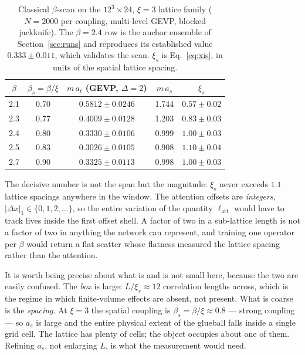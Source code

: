 \documentclass[11pt,a4paper]{article}
\newcommand{\at}{a_t}
\newcommand{\as}{a_s}
\begin{document}
\begin{table}[htbp]
  \centering
  \begin{tabular}{ccccc}
    \toprule
    $\beta$ & $\beta_s=\beta/\xi$ & $m\,\at$ (GEVP, $\Delta=2$) & $m\,\as$
            & $\xi_s$ \\
    \midrule
    2.1 & 0.70 & $0.5812\pm0.0246$ & 1.744 & $0.57\pm0.02$ \\
    2.3 & 0.77 & $0.4009\pm0.0128$ & 1.203 & $0.83\pm0.03$ \\
    2.4 & 0.80 & $0.3330\pm0.0106$ & 0.999 & $1.00\pm0.03$ \\
    2.5 & 0.83 & $0.3026\pm0.0105$ & 0.908 & $1.10\pm0.04$ \\
    2.7 & 0.90 & $0.3325\pm0.0113$ & 0.998 & $1.00\pm0.03$ \\
    \bottomrule
  \end{tabular}
  \caption{Classical $\beta$-scan on the $12^3\times24$, $\xi=3$ lattice
  family ($N=2000$ per coupling, multi-level GEVP, blocked jackknife). The
  $\beta=2.4$ row is the anchor ensemble of Section~\ref{sec:runs} and
  reproduces its established value $0.333\pm0.011$, which validates the scan.
  $\xi_s$ is Eq.~\eqref{eq:xis}, in units of the spatial lattice spacing.}
  \label{tab:betascan}
\end{table}

\noindent The decisive number is not the span but the magnitude: $\xi_s$ never
exceeds $1.1$ lattice spacings anywhere in the window. The attention offsets
are \emph{integers}, $|\Delta x|_1\in\{0,1,2,\dots\}$, so the entire variation
of the quantity $\ell_{\mathrm{att}}$ would have to track lives inside the
first offset shell. A factor of two in a sub-lattice length is not a factor of
two in anything the network can represent, and training one operator per
$\beta$ would return a flat scatter whose flatness measured the lattice
spacing rather than the attention.

It is worth being precise about what is and is not small here, because the two
are easily confused. The \emph{box} is large: $L/\xi_s \approx 12$ correlation
lengths across, which is the regime in which finite-volume effects are
absent, not present. What is coarse is the \emph{spacing}. At $\xi=3$ the
spatial coupling is $\beta_s=\beta/\xi\approx0.8$ --- strong coupling --- so
$\as$ is large and the entire physical extent of the glueball falls inside a
single grid cell. The lattice has plenty of cells; the object occupies about
one of them. Refining $\as$, not enlarging $L$, is what the measurement would
need.
\end{document}
